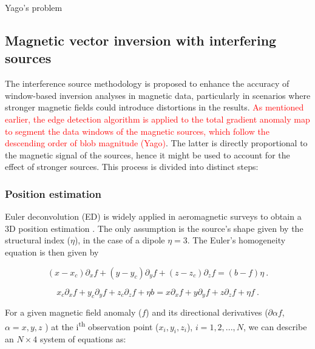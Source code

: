  Yago's problem

\subsection{Magnetic vector inversion with interfering sources}\label{inversion-section}

The interference source methodology is proposed to enhance the accuracy of window-based inversion analyses in magnetic data, particularly in scenarios where stronger magnetic fields could introduce distortions in the results. \textcolor{red}{As mentioned earlier, the edge detection algorithm is applied to the total gradient anomaly map to segment the data windows of the magnetic sources, which follow the descending order of blob magnitude (Yago)}. The latter is directly proportional to the magnetic signal of the sources, hence it might be used to account for the effect of stronger sources. This process is divided into distinct steps:


\subsubsection{Position estimation}
    Euler deconvolution (ED) is widely applied in aeromagnetic surveys \citep{Barbosa2011, Melo2013, Melo2018} to obtain a 3D position estimation \cite[after][]{Reid1990}. The only assumption is the source's shape given by the structural index ($\eta$), in the case of a dipole $\eta = 3$. The Euler's homogeneity equation is then given by
    
        \begin{equation}
        \label{eq_euler_homogeneity}
        (x - x_c)\partial_x f
        + (y - y_c)\partial_y f
        + (z - z_c)\partial_z f
        = (b - f)\eta
        \ .
        \end{equation}
    
    
    \begin{equation}
    x_c \partial_x f + y_c \partial_y f + z_c \partial_z f + \eta b
    =
    x \partial_x f + y \partial_y f + z \partial_z f + \eta f
    \ .
    \end{equation}
    
    For a given magnetic field anomaly ($f$) and its directional derivatives ($\partial \alpha f$, $\alpha = x, y, z$ ) at the i\textsuperscript{th} observation point ($x_i, y_i, z_i$), $i=1, 2,..., N$, we can describe an $N \times 4$ system of equations as:
    
